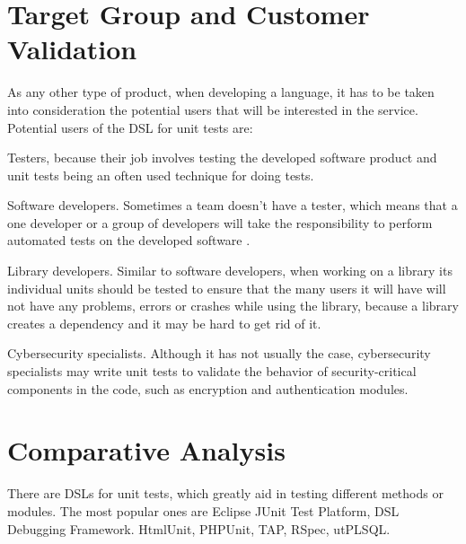 \section{Target Group and Customer Validation}

As any other type of product, when developing a language, it has to be taken into consideration the potential users that will be interested in the service. Potential users of the DSL for unit tests are:

Testers, because their job involves testing the developed software product and unit tests being an often used technique for doing tests.

Software developers. Sometimes a team doesn’t have a tester, which means that a one developer or a group of developers will take the responsibility to perform automated tests on the developed software \cite{methodpoet}.

Library developers. Similar to software developers, when working on a library its individual units should be tested to ensure that the many users it will have will not have any problems, errors or crashes while using the library, because a library creates a dependency and it may be hard to get rid of it.

Cybersecurity specialists. Although it has not usually the case, cybersecurity specialists may write unit tests to validate the behavior of security-critical components in the code, such as encryption and authentication modules. 

\section{Comparative Analysis}

There are DSLs for unit tests, which greatly aid in testing different methods or modules. The most popular ones are Eclipse JUnit Test Platform, DSL Debugging Framework. HtmlUnit, PHPUnit, TAP, RSpec, utPLSQL.

